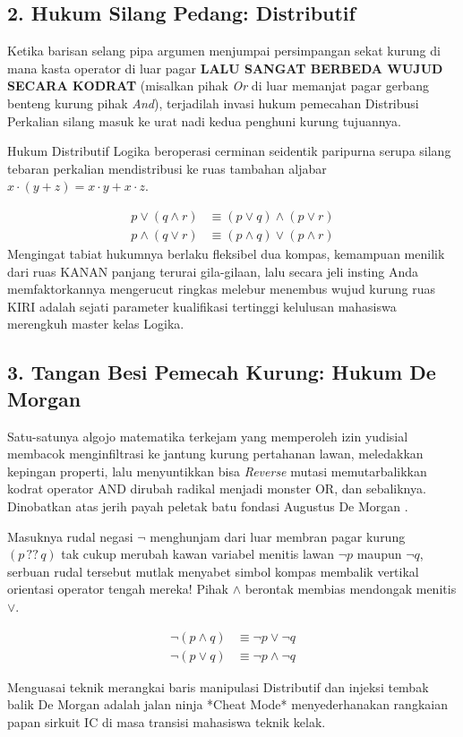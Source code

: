 \subsection{2. Hukum Silang Pedang: Distributif}

Ketika barisan selang pipa argumen menjumpai persimpangan sekat kurung di mana kasta operator di luar pagar \textbf{LALU SANGAT BERBEDA WUJUD SECARA KODRAT} (misalkan pihak \textit{Or} di luar memanjat pagar gerbang benteng kurung pihak \textit{And}), terjadilah invasi hukum pemecahan Distribusi Perkalian silang masuk ke urat nadi kedua penghuni kurung tujuannya.

Hukum Distributif Logika beroperasi cerminan seidentik paripurna serupa silang tebaran perkalian mendistribusi ke ruas tambahan aljabar $x \cdot (y+z) = x\cdot y + x\cdot z$.

\begin{align*}
    p \vee (q \wedge r) &\equiv (p \vee q) \wedge (p \vee r) \\
    p \wedge (q \vee r) &\equiv (p \wedge q) \vee (p \wedge r) 
\end{align*}
Mengingat tabiat hukumnya berlaku fleksibel dua kompas, kemampuan menilik dari ruas KANAN panjang terurai gila-gilaan, lalu secara jeli insting Anda memfaktorkannya mengerucut ringkas melebur menembus wujud kurung ruas KIRI adalah sejati parameter kualifikasi tertinggi kelulusan mahasiswa merengkuh master kelas Logika.

\subsection{3. Tangan Besi Pemecah Kurung: Hukum De Morgan}

Satu-satunya algojo matematika terkejam yang memperoleh izin yudisial membacok menginfiltrasi ke jantung kurung pertahanan lawan, meledakkan kepingan properti, lalu menyuntikkan bisa \textit{Reverse} mutasi memutarbalikkan kodrat operator AND dirubah radikal menjadi monster OR, dan sebaliknya. Dinobatkan atas jerih payah peletak batu fondasi Augustus De Morgan \cite{wiki_proplogic}.

\begin{teorema}
Masuknya rudal negasi $\neg$ menghunjam dari luar membran pagar kurung $(p \,??\, q)$ tak cukup merubah kawan variabel menitis lawan $\neg p$ maupun $\neg q$, serbuan rudal tersebut mutlak menyabet simbol kompas membalik vertikal orientasi operator tengah mereka! Pihak $\land$ berontak membias mendongak menitis $\lor$.
\end{teorema}

\begin{align*}
    \neg(p \wedge q) &\equiv \neg p \vee \neg q \\
    \neg(p \vee q) &\equiv \neg p \wedge \neg q
\end{align*}

Menguasai teknik merangkai baris manipulasi Distributif dan injeksi tembak balik De Morgan adalah jalan ninja *Cheat Mode* menyederhanakan rangkaian papan sirkuit IC di masa transisi mahasiswa teknik kelak.

